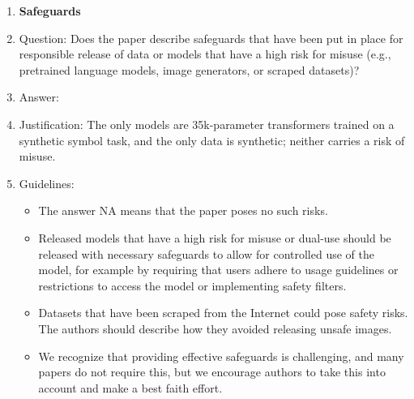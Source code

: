 \begin{enumerate}
\item {\bf Safeguards}
    \item[] Question: Does the paper describe safeguards that have been put in place for responsible release of data or models that have a high risk for misuse (e.g., pretrained language models, image generators, or scraped datasets)?
    \item[] Answer: \answerNA{}
    \item[] Justification: The only models are 35k-parameter transformers trained on a synthetic symbol task, and the only data is synthetic; neither carries a risk of misuse.
    \item[] Guidelines:
    \begin{itemize}
        \item The answer NA means that the paper poses no such risks.
        \item Released models that have a high risk for misuse or dual-use should be released with necessary safeguards to allow for controlled use of the model, for example by requiring that users adhere to usage guidelines or restrictions to access the model or implementing safety filters.
        \item Datasets that have been scraped from the Internet could pose safety risks. The authors should describe how they avoided releasing unsafe images.
        \item We recognize that providing effective safeguards is challenging, and many papers do not require this, but we encourage authors to take this into account and make a best faith effort.
    \end{itemize}


\end{enumerate}
